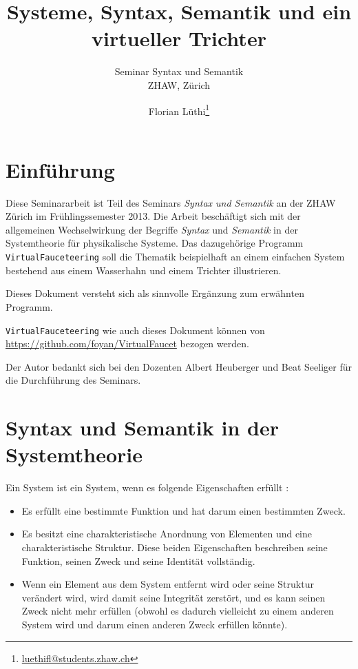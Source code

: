 \documentclass[11pt]{scrreprt} %
\title{Systeme, Syntax, Semantik und ein virtueller Trichter}
\subtitle{Seminar Syntax und Semantik \\ ZHAW, Zürich}
\author{Florian Lüthi\footnote{\url{luethifl@students.zhaw.ch}}}
\theoremstyle{definition}
\begin{document}
\maketitle

\tableofcontents

\chapter{Einführung}

Diese Seminararbeit ist Teil des Seminars {\it{Syntax und Semantik}} an der ZHAW Zürich im Frühlingssemester 2013. Die Arbeit beschäftigt sich mit der allgemeinen Wechselwirkung der Begriffe {\it Syntax} und {\it Semantik} in der Systemtheorie für physikalische Systeme. Das dazugehörige Programm {\tt VirtualFauceteering} soll die Thematik beispielhaft an einem einfachen System bestehend aus einem Wasserhahn und einem Trichter illustrieren.

Dieses Dokument versteht sich als sinnvolle Ergänzung zum erwähnten Programm.

{\tt VirtualFauceteering} wie auch dieses Dokument können von \url{https://github.com/foyan/VirtualFaucet} bezogen werden.

Der Autor bedankt sich bei den Dozenten Albert Heuberger und Beat Seeliger für die Durchführung des Seminars.

\chapter{Syntax und Semantik in der Systemtheorie}

Ein System ist ein System, wenn es folgende Eigenschaften erfüllt \cite{bossel}:
\begin{itemize}
\item Es erfüllt eine bestimmte Funktion und hat darum einen bestimmten Zweck.
\item Es besitzt eine charakteristische Anordnung von Elementen und eine charakteristische Struktur. Diese beiden Eigenschaften beschreiben seine Funktion, seinen Zweck und seine Identität vollständig.
\item Wenn ein Element aus dem System entfernt wird oder seine Struktur verändert wird, wird damit seine Integrität zerstört, und es kann seinen Zweck nicht mehr erfüllen (obwohl es dadurch vielleicht zu einem anderen System wird und darum einen anderen Zweck erfüllen könnte).
\end{itemize}

\end{document}
